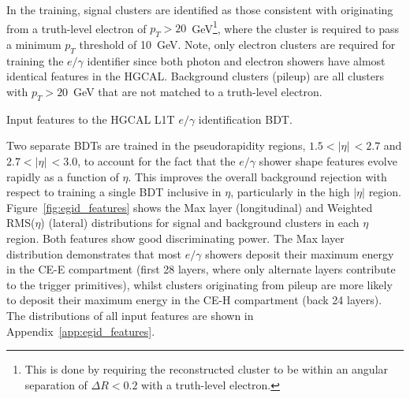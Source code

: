 In the training, signal clusters are identified as those consistent with originating from a truth-level electron of $p_T > 20$~GeV\footnote{This is done by requiring the reconstructed cluster to be within an angular separation of $\Delta R<0.2$ with a truth-level electron.}, where the cluster is required to pass a minimum $p_T$ threshold of 10~GeV. Note, only electron clusters are required for training the $e/\gamma$ identifier since both photon and electron showers have almost identical features in the HGCAL. Background clusters (pileup) are all clusters with $p_T>20$~GeV that are not matched to a truth-level electron. 

\begin{table}[htb!]
    \caption[HGCAL L1T $e/\gamma$ identification BDT input features]{Input features to the HGCAL L1T $e/\gamma$ identification BDT.}
    \label{tab:egid_features}
    \centering
    \scriptsize
    \renewcommand{\arraystretch}{2}
    \hspace*{-1.5cm}
    
    \hspace*{-1.5cm}
\end{table}

Two separate BDTs are trained in the pseudorapidity regions, $1.5<|\eta|\,<2.7$ and $2.7<|\eta|\,<3.0$, to account for the fact that the $e/\gamma$ shower shape features evolve rapidly as a function of $\eta$. This improves the overall background rejection with respect to training a single BDT inclusive in $\eta$, particularly in the high $|\eta|$ region. Figure~\ref{fig:egid_features} shows the Max layer (longitudinal) and Weighted RMS($\eta$) (lateral) distributions for signal and background clusters in each $\eta$ region. Both features show good discriminating power. The Max layer distribution demonstrates that most $e/\gamma$ showers deposit their maximum energy in the CE-E compartment (first 28 layers, where only alternate layers contribute to the trigger primitives), whilst clusters originating from pileup are more likely to deposit their maximum energy in the CE-H compartment (back 24 layers). The distributions of all input features are shown in Appendix~\ref{app:egid_features}.


